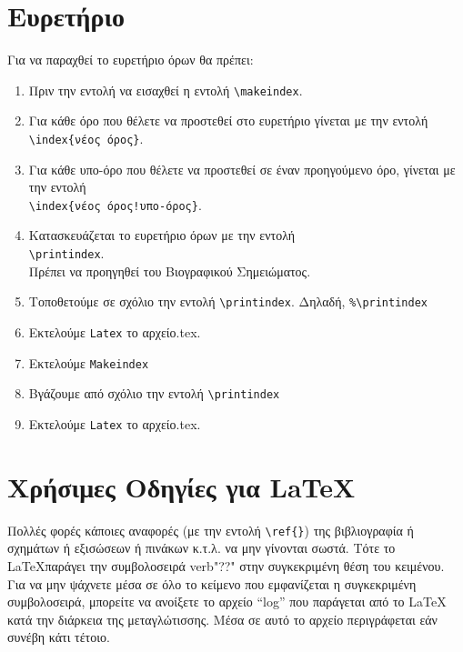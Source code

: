 \color{red}
\section{Ευρετήριο}
\label{sec:Index}

Για να παραχθεί το ευρετήριο όρων θα πρέπει:

\begin{enumerate}
  \item Πριν την εντολή \s \verb""\s να εισαχθεί η
  εντολή \s\s \verb"\makeindex".
  \item Για κάθε όρο που θέλετε να προστεθεί στο ευρετήριο γίνεται
  με την εντολή \\ \s\s \verb"\index{νέος όρος}".
  \item Για κάθε υπο-όρο που θέλετε να προστεθεί σε έναν προηγούμενο όρο, γίνεται
  με την εντολή\\ \s\s \verb"\index{νέος όρος!υπο-όρος}".
  \item Κατασκευάζεται το ευρετήριο όρων με την εντολή\\ \s\s
  \verb"\printindex". \\Πρέπει να προηγηθεί του Βιογραφικού
  Σημειώματος.
  \item Τοποθετούμε σε σχόλιο την εντολή \s\s
  \verb"\printindex". Δηλαδή, \s\s
  \verb"%\printindex"
  \item Εκτελούμε \s\s
  \verb"Latex" \s\s το αρχείο.tex.
  \item Εκτελούμε \s\s
  \verb"Makeindex"
  \item Βγάζουμε από σχόλιο την εντολή \s\s
  \verb"\printindex"
  \item Εκτελούμε \s\s
  \verb"Latex" \s\s το αρχείο.tex.
\end{enumerate}






\section{Χρήσιμες Οδηγίες για \LaTeX}
\label{sec:LaTeX}

Πολλές φορές κάποιες αναφορές (με την εντολή \verb"\ref{}") της
βιβλιογραφία ή σχημάτων ή εξισώσεων ή πινάκων κ.τ.λ. να μην
γίνονται σωστά. Τότε το \LaTeX παράγει την συμβολοσειρά verb"??"
στην συγκεκριμένη θέση του κειμένου. Για να μην ψάχνετε μέσα σε
όλο το κείμενο που εμφανίζεται η συγκεκριμένη συμβολοσειρά,
μπορείτε να ανοίξετε το αρχείο ``log'' που παράγεται από το \LaTeX
κατά την διάρκεια της μεταγλώτισσης. Μέσα σε αυτό το αρχείο
περιγράφεται εάν συνέβη κάτι τέτοιο.
\color{black}